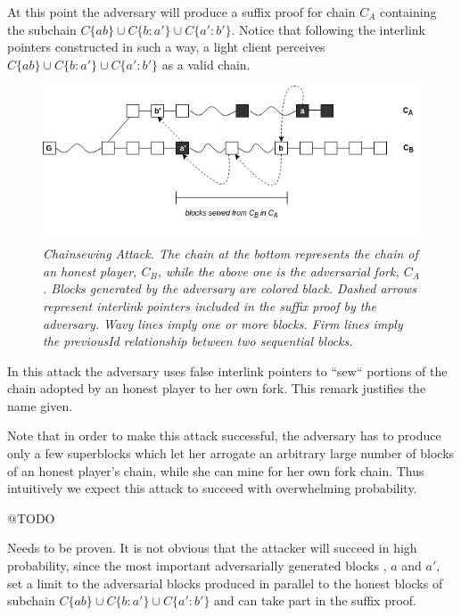 \documentclass[11pt,a4paper]{article}
\begin{document}
At this point the adversary will produce a suffix proof for chain $C_A$ containing the subchain $C\{ab\} \cup C\{b:a'\} \cup C\{a':b'\}$. Notice that following the interlink pointers constructed in such a way, a light client perceives $C\{ab\} \cup C\{b:a'\} \cup C\{a':b'\}$  as a valid chain.

\begin{figure}[h!]
	\begin{center}
		\includegraphics[scale=0.55]{figures/chainsewing_attack.png}
	\end{center}
	\caption{\textit{Chainsewing Attack. The chain at the bottom represents the chain of an honest player, $C_B$, while the above one is the adversarial fork, $C_A$. Blocks generated by the adversary are colored black. Dashed arrows represent interlink pointers included in the suffix proof by the adversary. Wavy lines imply one or more blocks. Firm lines imply the previousId relationship between two sequential blocks.}}
	\label{fig:attack}
\end{figure}

In this attack the adversary uses false interlink pointers to ``sew`` portions of the chain adopted by an honest player to her own fork. This remark justifies the name given.  

Note that in order to make this attack successful, the adversary has to produce only a few superblocks which let her arrogate an arbitrary large number of blocks of an honest player's chain, while she can mine for her own fork chain. Thus intuitively we expect this attack to succeed with overwhelming probability.

@TODO

Needs to be proven. It is not obvious that the attacker will succeed in high probability, since the most important adversarially generated blocks , $a$ and $a'$, set a limit to the adversarial blocks produced in parallel to the honest blocks of subchain $C\{ab\} \cup C\{b:a'\} \cup C\{a':b'\}$ and can take part in the suffix proof.
\end{document}
